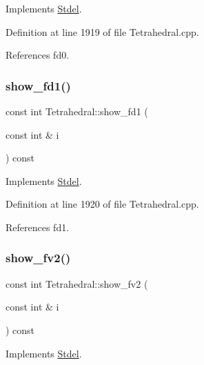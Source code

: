 Implements \hyperlink{classStdel_a0e05ccae64925915af5f07c91d61c7bc}{Stdel}.



Definition at line 1919 of file Tetrahedral.\+cpp.



References fd0.

\mbox{\label{classTetrahedral_ad45fb011e33abc16947617e99a30882a}} 
\subsubsection{\texorpdfstring{show\+\_\+fd1()}{show\_fd1()}}
{\footnotesize\ttfamily const int Tetrahedral\+::show\+\_\+fd1 (\begin{DoxyParamCaption}\item[{const int \&}]{i }\end{DoxyParamCaption}) const\hspace{0.3cm}{\ttfamily [virtual]}}



Implements \hyperlink{classStdel_af4a394fae421489159f40ddcb736353b}{Stdel}.



Definition at line 1920 of file Tetrahedral.\+cpp.



References fd1.

\mbox{\label{classTetrahedral_ab77ef395ad60c4efde2e2f5a3f7c8fcf}} 
\subsubsection{\texorpdfstring{show\+\_\+fv2()}{show\_fv2()}}
{\footnotesize\ttfamily const int Tetrahedral\+::show\+\_\+fv2 (\begin{DoxyParamCaption}\item[{const int \&}]{i }\end{DoxyParamCaption}) const\hspace{0.3cm}{\ttfamily [virtual]}}



Implements \hyperlink{classStdel_a67f16a65f02fc8a5aa10274539bd1ad8}{Stdel}.



